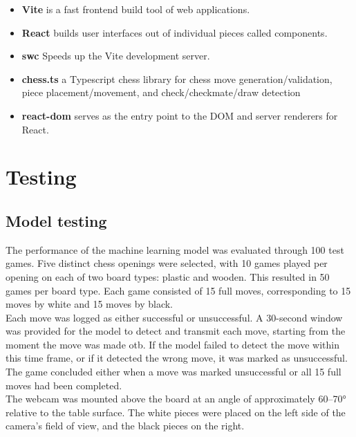 \begin{itemize}
    \item \textbf{Vite} is a fast frontend build tool of web applications. \cite{ts:vite}
    
    \item \textbf{React} builds user interfaces out of individual pieces called components. \cite{ts:react}
    
    \item \textbf{\acrshort{swc}} Speeds up the Vite development server. \cite{ts:swc}
    
    \item \textbf{chess.ts} a Typescript chess library for chess move generation/validation, piece placement/movement, and check/checkmate/draw detection \cite{ts:chess}
    
    \item \textbf{react-dom} serves as the entry point to the DOM and server renderers for React. \cite{ts:react-dom}
\end{itemize}

\section{Testing}
\label{sec:testing}

\subsection{Model testing}
\label{subsec:model-testing}

The performance of the machine learning model was evaluated through 100 test games. Five distinct chess openings were selected, with 10 games played per opening on each of two board types: plastic and wooden. This resulted in 50 games per board type. Each game consisted of 15 full moves, corresponding to 15 moves by white and 15 moves by black. \\

Each move was logged as either successful or unsuccessful. A 30-second window was provided for the model to detect and transmit each move, starting from the moment the move was made \gls{otb}. If the model failed to detect the move within this time frame, or if it detected the wrong move, it was marked as unsuccessful. The game concluded either when a move was marked unsuccessful or all 15 full moves had been completed. \\

The webcam was mounted above the board at an angle of approximately 60–70\si{\degree}
 relative to the table surface. The white pieces were placed on the left side of the camera's field of view, and the black pieces on the right.

